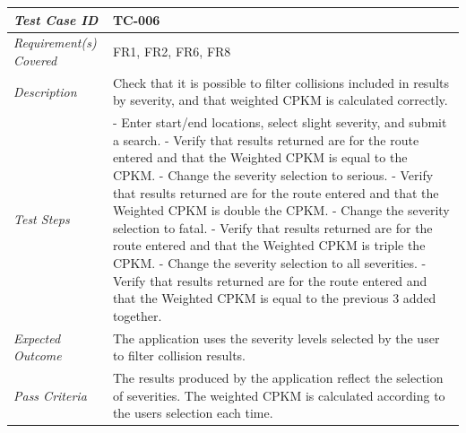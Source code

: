 \documentclass[authoryearcitations]{UoYCSproject}
\begin{document}
\begin{tabular}{| p{2.5cm} | p{11cm} |}
	\hline
	\textit{Test Case ID} & TC-006 \\ \hline
	\textit{Requirement(s) Covered} & FR1, FR2, FR6, FR8 \\ \hline
	\textit{Description} & Check that it is possible to filter collisions included in results by severity, and that weighted CPKM is calculated correctly. \\ \hline
	\textit{Test Steps}& - Enter start/end locations, select slight severity, and submit a search.
	\newline - Verify that results returned are for the route entered and that the Weighted CPKM is equal to the CPKM.
	\newline - Change the severity selection to serious.
	\newline - Verify that results returned are for the route entered and that the Weighted CPKM is double the CPKM.
	\newline - Change the severity selection to fatal.
	\newline - Verify that results returned are for the route entered and that the Weighted CPKM is triple the CPKM.
	\newline - Change the severity selection to all severities.
	\newline - Verify that results returned are for the route entered and that the Weighted CPKM is equal to the previous 3 added together.
 \\ \hline
	\textit{Expected Outcome} & The application uses the severity levels selected by the user to filter collision results.  \\ \hline
	\textit{Pass Criteria} & The results produced by the application reflect the selection of severities. The weighted CPKM is calculated according to the users selection each time. \\ \hline
\end{tabular}
\end{document}
